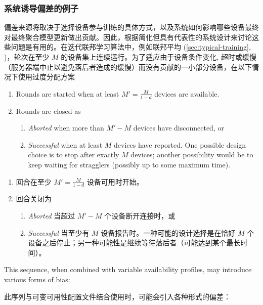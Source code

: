 \subsubsection{系统诱导偏差的例子}
偏差来源将取决于选择设备参与训练的具体方式，以及系统如何影响哪些设备最终对最终聚合模型更新做出贡献。因此，根据简化但具有代表性的系统设计来讨论这些问题是有用的。在迭代联邦学习算法中，例如联邦平均 (\cref{sec:typical-training}, \citep{mcmahan17fedavg})，轮次在至少 $M$ 的设备集上连续运行。为了适应由于设备条件变化, 超时或缓慢（服务器端中止以避免落后者造成的缓慢）而没有贡献的一小部分设备，在以下情况下使用过度分配方案

\begin{enumerate}
    \item Rounds are started when at least $M'=\frac{M}{1-d}$ devices are available.
    \item Rounds are closed as
    \begin{enumerate}
        \item \emph{Aborted} when more than $M' - M$ devices have disconnected, or
        \item \emph{Successful} when at least $M$ devices have reported. One possible design choice is to stop after exactly $M$ devices; another possibility would be to keep waiting for stragglers (possibly up to some maximum time).
    \end{enumerate}
\end{enumerate}

\begin{enumerate}
    \item 回合在至少 $M'=\frac{M}{1-d}$ 设备可用时开始。
    \item 回合关闭为
    \begin{enumerate}
        \item \emph{Aborted} 当超过 $M' - M$ 个设备断开连接时，或
        \item \emph{Successful} 当至少有 $M$ 设备报告时。一种可能的设计选择是在恰好 $M$ 个设备之后停止；另一种可能性是继续等待落后者（可能达到某个最长时间）。
    \end{enumerate}
\end{enumerate}
This sequence, when combined with variable availability profiles, may introduce various forms of bias:

此序列与可变可用性配置文件结合使用时，可能会引入各种形式的偏差：

